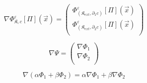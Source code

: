 \documentclass{article}
\begin{document}
\[
  \nabla \Phi_{\mathfrak{K}, c}^{\varepsilon}[\Pi](\vec{x}) =
  \begin{pmatrix}
    \Phi_{(\mathfrak{K}_{ext},\partial_1 c)}^{\varepsilon}[\Pi](\vec{x}) \\
    \Phi_{(\mathfrak{K}_{ext},\partial_2 c)}^{\varepsilon}[\Pi](\vec{x}) \\
  \end{pmatrix}
\]

\[
  \nabla \Psi =
  \begin{pmatrix}
    \nabla \Phi_1 \\
    \nabla \Phi_2 \\
  \end{pmatrix}
\]

\[
  \nabla \left(\alpha \Phi_1 + \beta \Phi_2 \right) =
  \alpha  \nabla \Phi_1 + \beta \nabla \Phi_2
\]
\end{document}
